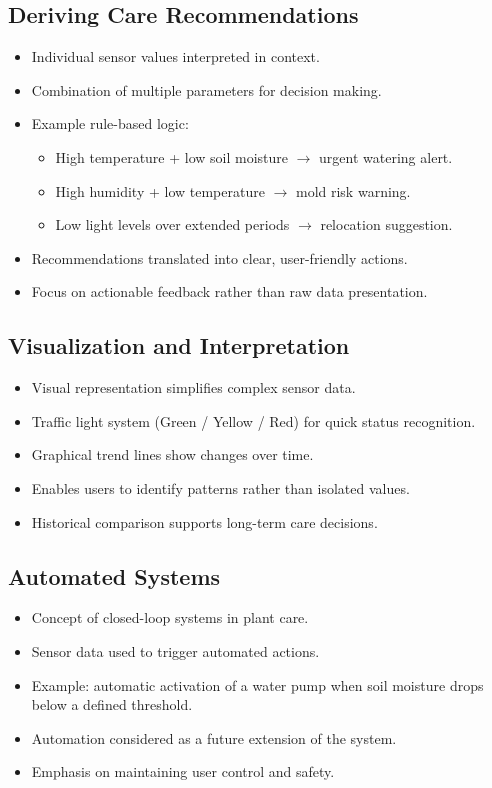 \subsection{Deriving Care Recommendations}
\begin{itemize}
    \item Individual sensor values interpreted in context.
    \item Combination of multiple parameters for decision making.
    \item Example rule-based logic:
    \begin{itemize}
        \item High temperature + low soil moisture $\rightarrow$ urgent watering alert.
        \item High humidity + low temperature $\rightarrow$ mold risk warning.
        \item Low light levels over extended periods $\rightarrow$ relocation suggestion.
    \end{itemize}
    \item Recommendations translated into clear, user-friendly actions.
    \item Focus on actionable feedback rather than raw data presentation.
\end{itemize}

\subsection{Visualization and Interpretation}
\begin{itemize}
    \item Visual representation simplifies complex sensor data.
    \item Traffic light system (Green / Yellow / Red) for quick status recognition.
    \item Graphical trend lines show changes over time.
    \item Enables users to identify patterns rather than isolated values.
    \item Historical comparison supports long-term care decisions.
\end{itemize}

\subsection{Automated Systems}
\begin{itemize}
    \item Concept of closed-loop systems in plant care.
    \item Sensor data used to trigger automated actions.
    \item Example: automatic activation of a water pump when soil moisture drops below a defined threshold.
    \item Automation considered as a future extension of the system.
    \item Emphasis on maintaining user control and safety.
\end{itemize}

